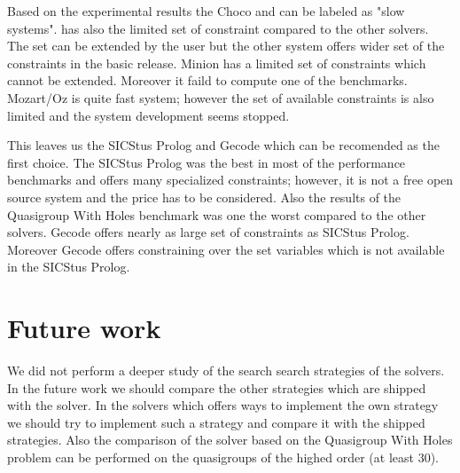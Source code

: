 Based on the experimental results the Choco and \eclipse can be labeled as "slow systems".
\eclipse has also the limited set of constraint compared to the other solvers. The 
set can be extended by the user but the other system offers wider set of the 
constraints in the basic release. Minion has a limited set of constraints which 
cannot be extended. Moreover it faild to compute one of the benchmarks. Mozart/Oz
is quite fast system; however the set of available constraints is also limited and
the system development seems stopped.

This leaves us the SICStus Prolog and Gecode which can be recomended as the first
choice. The SICStus Prolog was the best in most of the performance benchmarks and offers 
many specialized constraints; however, it is not a free open source system and
the price has to be considered. Also the results of the Quasigroup With Holes benchmark
was one the worst compared to the other solvers. Gecode offers nearly as large set of constraints
as SICStus Prolog. Moreover Gecode offers constraining over the set variables which
is not available in the SICStus Prolog.

\section{Future work}
We did not perform a deeper study of the search search strategies of
the solvers. In the future work we should compare the other strategies which are shipped
with the solver. In the solvers which offers ways to implement the own strategy we 
should try to implement such a strategy and compare it with the shipped strategies.
Also the comparison of the solver based on the Quasigroup With Holes problem can
be performed on the quasigroups of the highed order (at least 30).